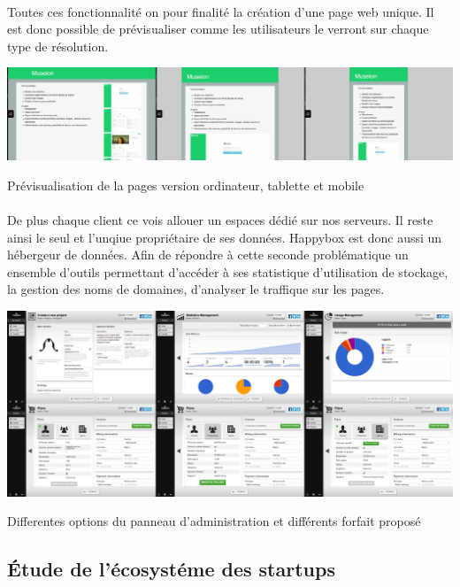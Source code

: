 \documentclass[11pt, a4paper ]{article}
\begin{document}
\begin{spacing}{1.5}
\paragraph{}

Toutes ces fonctionnalité on pour finalité la création d'une page web unique. Il est donc possible de prévisualiser comme les utilisateurs le verront sur chaque type de résolution.
\begin{center}
	\includegraphics[width=\textwidth]{images/HBscreen/preview.png}
	\caption{Prévisualisation de la pages version ordinateur, tablette et mobile}
\end{center}

\paragraph{}
De plus chaque client ce vois allouer un espaces dédié sur nos serveurs. Il reste ainsi le seul et l'unqiue propriétaire de ses données. Happybox est donc aussi un hébergeur de données. Afin de répondre à cette seconde problématique un ensemble d'outils permettant d'accéder à ses statistique d'utilisation de stockage, la gestion des noms de domaines, d'analyser le traffique sur les pages.

\begin{center}
	\includegraphics[width=\textwidth]{images/HBscreen/dash.png}
	\caption{Differentes options du panneau d'administration et différents forfait proposé}
\end{center}


	\subsection{Étude de l'écosystéme des startups}


\end{spacing}
\end{document}
